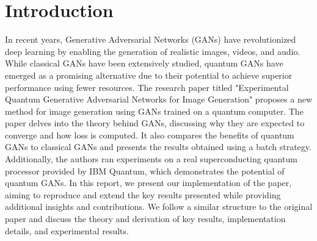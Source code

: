 \section{Introduction}
In recent years, Generative Adversarial Networks (GANs) have revolutionized deep learning by enabling the generation of realistic images, videos, and audio. While classical GANs have been extensively studied, quantum GANs have emerged as a promising alternative due to their potential to achieve superior performance using fewer resources. The research paper titled "Experimental Quantum Generative Adversarial Networks for Image Generation" proposes a new method for image generation using GANs trained on a quantum computer. The paper delves into the theory behind GANs, discussing why they are expected to converge and how loss is computed. It also compares the benefits of quantum GANs to classical GANs and presents the results obtained using a batch strategy. Additionally, the authors ran experiments on a real superconducting quantum processor provided by IBM Quantum, which demonstrates the potential of quantum GANs. In this report, we present our implementation of the paper, aiming to reproduce and extend the key results presented while providing additional insights and contributions. We follow a similar structure to the original paper and discuss the theory and derivation of key results, implementation details, and experimental results.

